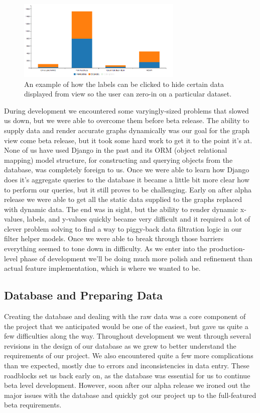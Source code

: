 \documentclass[10pt,draftclsnofoot,onecolumn]{IEEEtran}
\begin{document}
\begin{figure}[h]
\centering
\includegraphics[width=0.70\textwidth]{images/bar_chart_collapsed.png}
\captionsetup{justification=centering}
\caption{
  An example of how the labels can be clicked to hide certain data displayed from view so the user can zero-in on a particular dataset.
}
\label{fig:bar_chart_collapsed}
\end{figure}

During development we encountered some varyingly-sized problems that slowed us down, but we were able to overcome them before beta release.
The ability to supply data and render accurate graphs dynamically was our goal for the graph view come beta release, but it took some hard work to get it to the point it's at.
None of us have used Django in the past and its ORM (object relational mapping) model structure, for constructing and querying objects from the database, was completely foreign to us.
Once we were able to learn how Django does it’s aggregate queries to the database it became a little bit more clear how to perform our queries, but it still proves to be challenging.
Early on after alpha release we were able to get all the static data supplied to the graphs replaced with dynamic data.
The end was in sight, but the ability to render dynamic x-values, labels, and y-values quickly became very difficult and it required a lot of clever problem solving to find a way to piggy-back data filtration logic in our filter helper models.
Once we were able to break through those barriers everything seemed to tone down in difficulty.
As we enter into the production-level phase of development we'll be doing much more polish and refinement than actual feature implementation, which is where we wanted to be.

\subsection{Database and Preparing Data}

Creating the database and dealing with the raw data was a core component of the project that we anticipated would be one of the easiest, but gave us quite a few difficulties along the way.
Throughout development we went through several revisions in the design of our database as we grew to better understand the requirements of our project.
We also encountered quite a few more complications than we expected, mostly due to errors and inconsistencies in data entry.
These roadblocks set us back early on, as the database was essential for us to continue beta level development.
However, soon after our alpha release we ironed out the major issues with the database and quickly got our project up to the full-featured beta requirements.
\end{document}

